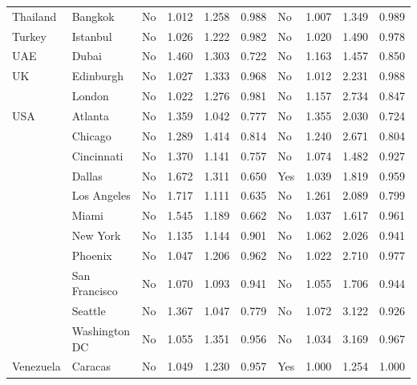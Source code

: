 \documentclass[Afour,sageh,times]{sagej}
\begin{document}
\begin{table}[htbp]
\begin{tabular}{ l l l r r r l r r r }
Thailand     & Bangkok       &       No &  1.012 &  1.258 &  0.988 &       No &  1.007 &  1.349 &  0.989 \\
Turkey       & Istanbul      &       No &  1.026 &  1.222 &  0.982 &       No &  1.020 &  1.490 &  0.978 \\
UAE          & Dubai         &       No &  1.460 &  1.303 &  0.722 &       No &  1.163 &  1.457 &  0.850 \\
UK           & Edinburgh     &       No &  1.027 &  1.333 &  0.968 &       No &  1.012 &  2.231 &  0.988 \\
             & London        &       No &  1.022 &  1.276 &  0.981 &       No &  1.157 &  2.734 &  0.847 \\
USA          & Atlanta       &       No &  1.359 &  1.042 &  0.777 &       No &  1.355 &  2.030 &  0.724 \\
             & Chicago       &       No &  1.289 &  1.414 &  0.814 &       No &  1.240 &  2.671 &  0.804 \\
             & Cincinnati    &       No &  1.370 &  1.141 &  0.757 &       No &  1.074 &  1.482 &  0.927 \\
             & Dallas        &       No &  1.672 &  1.311 &  0.650 &      Yes &  1.039 &  1.819 &  0.959 \\
             & Los Angeles   &       No &  1.717 &  1.111 &  0.635 &       No &  1.261 &  2.089 &  0.799 \\
             & Miami         &       No &  1.545 &  1.189 &  0.662 &       No &  1.037 &  1.617 &  0.961 \\
             & New York      &       No &  1.135 &  1.144 &  0.901 &       No &  1.062 &  2.026 &  0.941 \\
             & Phoenix       &       No &  1.047 &  1.206 &  0.962 &       No &  1.022 &  2.710 &  0.977 \\
             & San Francisco &       No &  1.070 &  1.093 &  0.941 &       No &  1.055 &  1.706 &  0.944 \\
             & Seattle       &       No &  1.367 &  1.047 &  0.779 &       No &  1.072 &  3.122 &  0.926 \\
             & Washington DC &       No &  1.055 &  1.351 &  0.956 &       No &  1.034 &  3.169 &  0.967 \\
Venezuela    & Caracas       &       No &  1.049 &  1.230 &  0.957 &      Yes &  1.000 &  1.254 &  1.000 \\
\bottomrule
\end{tabular}
\end{table}
\end{document}
